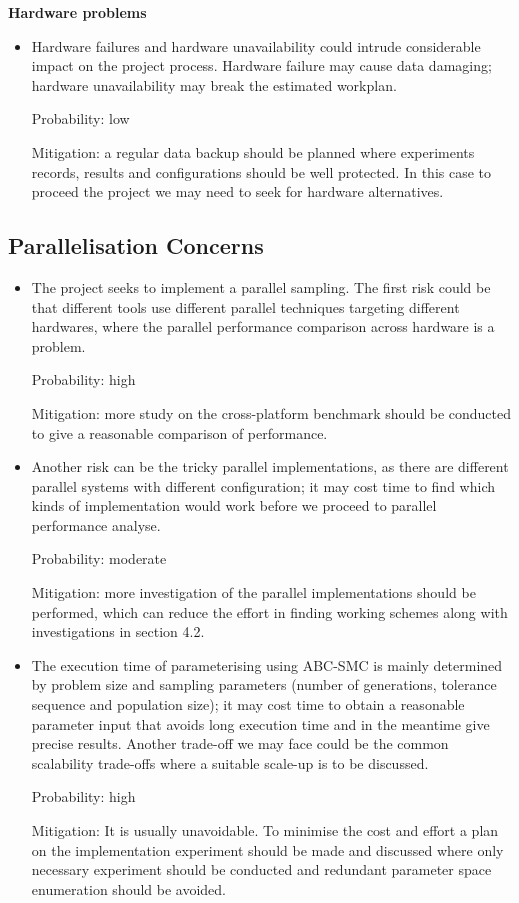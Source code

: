 \documentclass{article}
\begin{document}
\textbf{Hardware problems} 

\begin{itemize}
	\item Hardware failures and hardware unavailability could intrude considerable impact on the project process. Hardware failure may cause data damaging; hardware unavailability may break the estimated workplan.
	
	Probability: low
	
	Mitigation: a regular data backup should be planned where experiments records, results and configurations should be well protected. In this case to proceed the project we may need to seek for hardware alternatives.
\end{itemize}

\subsection{Parallelisation Concerns}

\begin{itemize}
	\item The project seeks to implement a parallel sampling. The first risk could be that different tools use different parallel techniques targeting different hardwares, where the parallel performance comparison across hardware is a problem.
	
	Probability: high
	
	Mitigation: more study on the cross-platform benchmark should be conducted to give a reasonable comparison of performance.

	\item Another risk can be the tricky parallel implementations, as there are different parallel systems with different configuration; it may cost time to find which kinds of implementation would work before we proceed to parallel performance analyse.
	
	Probability: moderate
	
	Mitigation: more investigation of the parallel implementations should be performed, which can reduce the effort in finding working schemes along with investigations in section 4.2.

	\item The execution time of parameterising using ABC-SMC is mainly determined by problem size and sampling parameters (number of generations, tolerance sequence and population size); it may cost time to obtain a reasonable parameter input that avoids long execution time and in the meantime give precise results. Another trade-off we may face could be the common scalability trade-offs where a suitable scale-up is to be discussed.
	
	Probability: high
	
	Mitigation: It is usually unavoidable. To minimise the cost and effort a plan on the implementation experiment should be made and discussed where only necessary experiment should be conducted and redundant parameter space enumeration should be avoided. 
\end{itemize}
\end{document}
